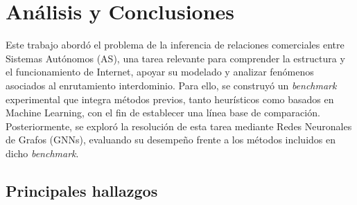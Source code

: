﻿\chapter{Análisis y Conclusiones}

Este trabajo abordó el problema de la inferencia de relaciones comerciales entre Sistemas Autónomos (AS), una tarea relevante para comprender la estructura y el funcionamiento de Internet, apoyar su modelado y analizar fenómenos asociados al enrutamiento interdominio. 
Para ello, se construyó un \textit{benchmark} experimental que integra métodos previos, tanto heurísticos como basados en Machine Learning, con el fin de establecer una línea base de comparación. 
Posteriormente, se exploró la resolución de esta tarea mediante Redes Neuronales de Grafos (GNNs), evaluando su desempeño frente a los métodos incluidos en dicho \textit{benchmark}.\\

\section{Principales hallazgos}


